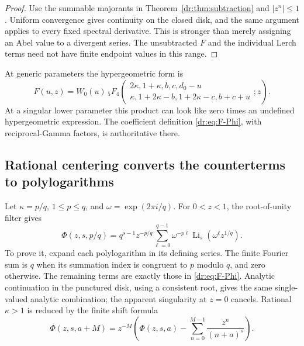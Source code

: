 \documentclass[11pt,letterpaper]{article}
\numberwithin{equation}{section}
\theoremstyle{definition}
\theoremstyle{remark}
\DeclareMathOperator{\Li}{Li}
\begin{document}
\begin{proof}
Use the summable majorants in Theorem~\ref{dr:thm:subtraction} and
$|z^n|\leq1$. Uniform convergence gives continuity on the closed disk,
and the same argument applies to every fixed spectral derivative. This
is stronger than merely assigning an Abel value to a divergent series.
The unsubtracted $F$ and the individual Lerch terms need not have finite
endpoint values in this range.
\end{proof}

At generic parameters the hypergeometric form is
\begin{equation}
 F(u,z)=W_0(u)\,
 {}_5F_4\!\left(\begin{matrix}
 2\kappa,1+\kappa,b,c,d_0-u\\
 \kappa,1+2\kappa-b,1+2\kappa-c,b+c+u
 \end{matrix};z\right).
 \label{dr:eq:F-hyper}
\end{equation}
At a singular lower parameter this product can look like zero times an
undefined hypergeometric expression. The coefficient definition
\eqref{dr:eq:F-Phi}, with reciprocal-Gamma factors, is authoritative there.

\subsection{Rational centering converts the counterterms to polylogarithms}

Let $\kappa=p/q$, $1\leq p\leq q$, and
$\omega=\exp(2\pi i/q)$. For $0<z<1$, the root-of-unity filter gives
\begin{equation}
 \Phi(z,s,p/q)=q^{s-1}z^{-p/q}
       \sum_{\ell=0}^{q-1}\omega^{-p\ell}
                     \Li_s(\omega^\ell z^{1/q}).
 \label{dr:eq:root-filter}
\end{equation}
To prove it, expand each polylogarithm in its defining series. The finite
Fourier sum is $q$ when its summation index is congruent to $p$ modulo
$q$, and zero otherwise. The remaining terms are exactly those in
\eqref{dr:eq:F-Phi}. Analytic continuation in the punctured disk, using a
consistent root, gives the same single-valued analytic combination; the
apparent singularity at $z=0$ cancels. Rational $\kappa>1$ is reduced by
the finite shift formula
\begin{equation}
 \Phi(z,s,a+M)=z^{-M}\left(\Phi(z,s,a)
                  -\sum_{n=0}^{M-1}\frac{z^n}{(n+a)^s}\right).
 \label{dr:eq:lerch-shift}
\end{equation}
\end{document}
